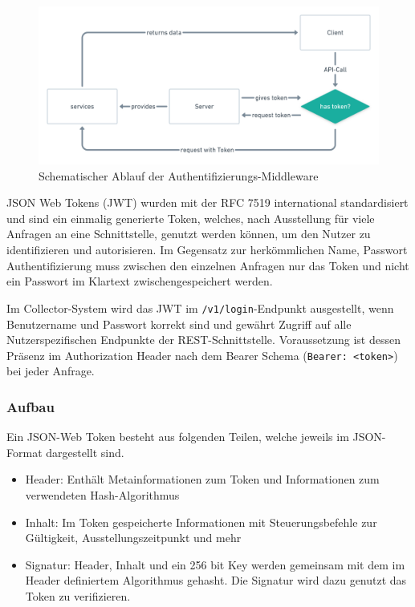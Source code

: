         \begin{figure}[h]
        	\centering
            \includegraphics[width=\textwidth]{images/collector-jwt-auth-process.png}
            \caption{Schematischer Ablauf der Authentifizierungs-Middleware}
        \end{figure}
        
        JSON Web Tokens (JWT) wurden mit der RFC 7519 international standardisiert und sind ein einmalig generierte Token, welches, nach Ausstellung für viele Anfragen an eine Schnittstelle, genutzt werden können, um den Nutzer zu identifizieren und autorisieren. Im Gegensatz zur herkömmlichen Name, Passwort Authentifizierung muss zwischen den einzelnen Anfragen nur das Token und nicht ein Passwort im Klartext zwischengespeichert werden.

        Im Collector-System wird das JWT im \texttt{/v1/login}-Endpunkt ausgestellt, wenn Benutzername und Passwort korrekt sind und gewährt Zugriff auf alle Nutzerspezifischen Endpunkte der REST-Schnittstelle. Voraussetzung ist dessen Präsenz im Authorization Header nach dem Bearer Schema (\texttt{Bearer: <token>}) bei jeder Anfrage.
        
        \subsubsection{Aufbau}
        Ein JSON-Web Token besteht aus folgenden Teilen, welche jeweils im JSON-Format dargestellt sind.
        \begin{itemize}
            \item Header: Enthält Metainformationen zum Token und Informationen zum verwendeten Hash-Algorithmus
            \item Inhalt: Im Token gespeicherte Informationen mit Steuerungsbefehle zur Gültigkeit, Ausstellungszeitpunkt und mehr
            \item Signatur: Header, Inhalt und ein 256 bit Key werden gemeinsam mit dem im Header definiertem Algorithmus gehasht. Die Signatur wird dazu genutzt das Token zu verifizieren.
        \end{itemize}
        
